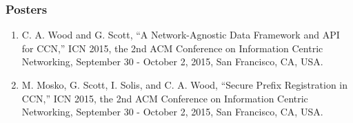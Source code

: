 \documentclass[10pt]{res}
\begin{document}
\begin{resume}
\vspace{-15pt}
\subsubsection*{Posters}
\begin{enumerate}[P-1.]
	\item C. A. Wood and G. Scott, ``A Network-Agnostic Data Framework and API for CCN,'' ICN 2015, the 2nd ACM Conference on Information Centric Networking, September 30 - October 2, 2015, San Francisco, CA, USA.

	\item M. Mosko, G. Scott, I. Solis, and C. A. Wood, ``Secure Prefix Registration in CCN,'' ICN 2015, the 2nd ACM Conference on Information Centric Networking, September 30 - October 2, 2015, San Francisco, CA, USA.
\end{enumerate}


\vspace{-15pt}

\end{resume}
\end{document}
